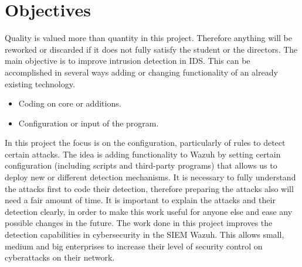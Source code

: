 \section{Objectives}
Quality is valued more than quantity in this project. Therefore anything will be reworked or discarded if it does not fully satisfy the student or the directors.
\linej
\linej
The main objective is to improve intrusion detection in IDS. This can be accomplished in several ways adding or changing functionality of an already existing technology.
\begin{itemize}
	\item Coding on core or additions.
	\item Configuration or input of the program.
\end{itemize}
\linej
In this project the focus is on the configuration, particularly of rules to detect certain attacks.
The idea is adding functionality to Wazuh by setting certain configuration (including scripts and third-party programs) that allows us to deploy new or different detection mechanisms.
\linej
It is necessary to fully understand the attacks first to code their detection, therefore preparing the attacks also will need a fair amount of time.
It is important to explain the attacks and their detection clearly, in order to make this work useful for anyone else and ease any possible changes in the future.
\linej
\linej
The work done in this project improves the detection capabilities in cybersecurity in the SIEM Wazuh. This allows small, medium and big enterprises to increase their level of security control on cyberattacks on their network.

